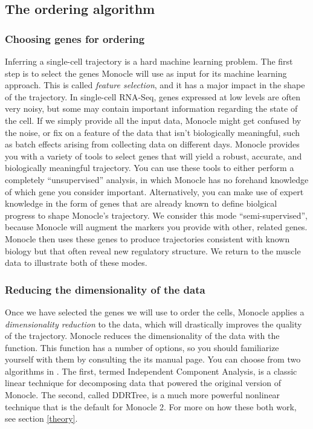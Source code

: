 \documentclass[10pt,oneside]{article}\usepackage[]{graphicx}\usepackage[]{color}
\begin{document}
 \subsection{The ordering algorithm}
 
 \subsubsection{Choosing genes for ordering}
 Inferring a single-cell trajectory is a hard machine learning problem. The first step is to select the genes Monocle will use as input for its machine learning approach. This is called \emph{feature selection}, and it has a major impact in the shape of the trajectory. In single-cell RNA-Seq, genes expressed at low levels are often very noisy, but some may contain important information regarding the state of the cell.  If we simply provide all the input data, Monocle might get confused by the noise, or fix on a feature of the data that isn't biologically meaningful, such as batch effects arising from collecting data on different days. Monocle provides you with a variety of tools to select genes that will yield a robust, accurate, and biologically meaningful trajectory. You can use these tools to either perform a completely ``unsupervised'' analysis, in which Monocle has no forehand knowledge of which gene you consider important. Alternatively, you can make use of expert knowledge in the form of genes that are already known to define biolgical progress to shape Monocle's trajectory. We consider this mode ``semi-supervised'', because Monocle will augment the markers you provide with other, related genes. Monocle then uses these genes to produce trajectories consistent with known biology but that often reveal new regulatory structure. We return to the muscle data to illustrate both of these modes.
 
 \subsubsection{Reducing the dimensionality of the data}
 Once we have selected the genes we will use to order the cells, Monocle applies a \emph{dimensionality reduction} to the data, which will drastically improves the quality of the trajectory. Monocle reduces the dimensionality of the data with the  function. This function has a number of options, so you should familiarize yourself with them by consulting the its manual page. You can choose from two algorithms in . The first, termed Independent Component Analysis, is a classic linear technique for decomposing data that powered the original version of Monocle. The second, called DDRTree, is a much more powerful nonlinear technique that is the default for Monocle 2.  For more on how these both work, see section \ref{theory}.   
 
\end{document}
